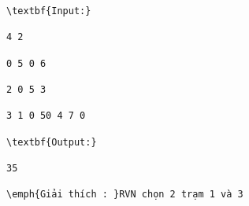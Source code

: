\begin{verbatim}
\textbf{Input:}

4 2

0 5 0 6

2 0 5 3

3 1 0 50 4 7 0

\textbf{Output:}

35

\emph{Giải thích : }RVN chọn 2 trạm 1 và 3\end{verbatim}